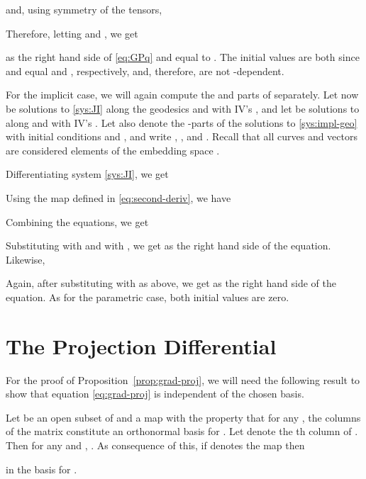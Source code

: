\documentclass[final]{svjour3}
\begin{document}
    and, using symmetry of the tensors,
    
    Therefore, letting  and , we get
     
    as the right hand side of \eqref{eq:GPq}
    and  equal to .
    The initial values are both  since  and
     equal  and , respectively, and, therefore, are not -dependent.
    
    For the implicit case, we will again compute the  and 
    parts of  separately. Let now  
    be solutions to \eqref{sys:JI} along the geodesics  and with IV's
    , and let  be
    solutions to  along  and with IV's .
    Let also  denote the -parts of the solutions to \eqref{sys:impl-geo} with
    initial conditions  and , and write , ,
    and . Recall that all curves and vectors are considered
    elements of the embedding space .

    Differentiating system \eqref{sys:JI}, we get
    
    Using the map  defined in \eqref{eq:second-deriv}, we have
    
    Combining the equations, we get
    
    Substituting  with  and  with , we get
     as the right hand side of the equation.
    Likewise,
    
    Again, after substituting  with  as above, we get  as the
    right hand side of the equation. As for the parametric case, both initial
    values are zero.
    

\section{The Projection Differential}
\label{app:B}
For the proof of Proposition~\ref{prop:grad-proj}, we will need the following result 
to show that equation \eqref{eq:grad-proj} is independent of the chosen basis.
\begin{lemma}
    Let  be an open subset of  and  a  map with the property that for any
    , the columns of the matrix  constitute an orthonormal basis
    for . Let  denote the th column of . Then for any
     and ,
    . As consequence of
    this, if  denotes the map 
    then
    
    in the basis  for
    .
    
    \label{lem:orth-deriv}
\end{lemma}





\end{document}
